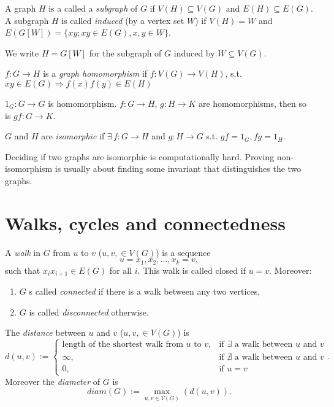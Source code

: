 \begin{definition}
A graph $H$ is a called a \emph{subgraph} of $G$ if $V(H)\subseteq V(G)$ and $E(H)\subseteq E(G) $. A subgraph $H$ is called \emph{induced} (by a vertex set $W$) if $V(H)=W$ and $E(G[W])=\{xy; xy\in E(G), x,y\in W\}$.
\end{definition}

We write $H=G[W]$ for the subgraph of $G$ induced by $W\subseteq V(G)$.

\begin{definition}
$f:G\rightarrow H$ is a \emph{graph homomorphism} if $f:V(G)\rightarrow V(H)$, \newline s.t. $xy\in E(G)\Rightarrow f(x)f(y)\in E(H)$
\end{definition}

\begin{lemma}
$1_G:G\rightarrow G$ is homomorphism. $f:G\rightarrow H$, $g:H\rightarrow K$ are homomorphisms, then so is $gf:G\rightarrow K$.
\end{lemma}

\begin{definition}
$G$ and $H$ are \emph{isomorphic} if $\exists\,f:G\rightarrow H$ and $g:H\rightarrow G$ s.t. $gf=1_G, fg=1_H$.
\end{definition}

Deciding if two graphs are isomorphic is computationally hard. Proving non-isomorphism is usually about finding some invariant that distinguishes the two graphs.


\section{Walks, cycles and connectedness}

\begin{definition}
A \emph{walk} in $G$ from $u$ to $v$ ($u,v, \in V(G)$) is a sequence
$$u=x_1,x_2,\dots,x_k=v,$$
such that $x_ix_{i+1} \in E(G)$ for all $i$. This walk is called closed if $u=v$. Moreover:
\begin{enumerate}
\item $G$ s called \emph{connected} if there is a walk between any two vertices,
\item $G$ is called \emph{disconnected} otherwise.
\end{enumerate}
\end{definition}

\begin{definition} The \emph{distance} between $u$ and $v$ ($u,v, \in V(G)$) is
$$d(u,v):=
\begin{cases} 
\text{length of the shortest walk from $u$ to $v$}, & \text{if $\exists$ a walk between $u$ and $v$}\\ 
\infty, & \text{if $\nexists$ a walk between $u$ and $v$}\\
0, & \text{if } u=v
\end{cases}.$$
Moreover the \emph{diameter} of $G$ is
$$diam(G):= \max_{u,v\in V(G)}(d(u,v)).$$
\end{definition}


